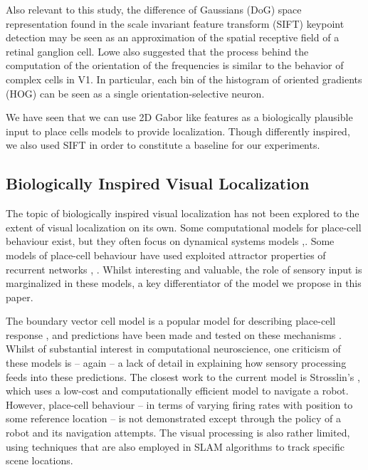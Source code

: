 Also relevant to this study, the difference of Gaussians (DoG) space representation found in the scale invariant feature transform (SIFT) keypoint detection \cite{lowe2004distinctive} may be seen as an approximation of the spatial receptive field of a retinal ganglion cell. Lowe also suggested that the process behind the computation of the orientation of the frequencies is similar to the behavior of complex cells in V1. In particular, each bin of the histogram of oriented gradients (HOG) can be seen as a single orientation-selective neuron.

We have seen that we can use 2D Gabor like features as a biologically plausible input to place cells models to provide localization. Though differently inspired, we also used SIFT in order to constitute a baseline for our experiments.


\subsection{Biologically Inspired Visual Localization}

The topic of biologically inspired visual localization has not been explored to the extent of visual localization on its own. Some computational models for place-cell behaviour exist, but they often focus on dynamical systems models \cite{blair2008conversion},\cite{bechtel2013investigating}. Some models of place-cell behaviour have used exploited attractor properties of recurrent networks \cite{stringer2002self}, \cite{moser2008place}.  Whilst interesting and valuable, the role of sensory input is marginalized in these models, a key differentiator of the model we propose in this paper.

The boundary vector cell model is a popular model for describing place-cell response \cite{barry2006boundary}, and predictions have been made and tested on these mechanisms \cite{burgess2000predictions}. Whilst of substantial interest in computational neuroscience, one criticism of these models is -- again -- a lack of detail in explaining how sensory processing feeds into these predictions. The closest work to the current model is Strosslin's \cite{strosslin2005robust}, which uses a low-cost and computationally efficient model to navigate a robot.  However, place-cell behaviour -- in terms of varying firing rates with position to some reference location -- is not demonstrated except through the policy of a robot and its navigation attempts.  The visual processing is also rather limited, using techniques that are also employed in SLAM algorithms \cite{alcantarilla2010visual} to track specific scene locations. 

